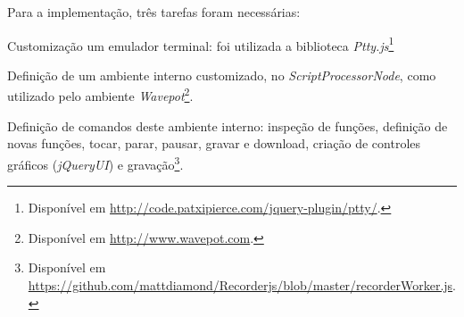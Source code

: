 Para a implementação, três tarefas foram necessárias: \begin{inparaenum}
\item Customização um emulador terminal: foi utilizada a biblioteca \emph{Ptty.js}\footnote{Disponível em \url{http://code.patxipierce.com/jquery-plugin/ptty/}.}
\item Definição de um ambiente interno customizado, no \emph{ScriptProcessorNode}, como utilizado pelo ambiente \emph{Wavepot}\footnote{Disponível em \url{http://www.wavepot.com}.}.
\item Definição de comandos deste ambiente interno: inspeção de funções, definição de novas funções, tocar, parar, pausar, gravar e download, criação de controles gráficos (\emph{jQueryUI}) e gravação\footnote{Disponível em \url{https://github.com/mattdiamond/Recorderjs/blob/master/recorderWorker.js}.}.
\end{inparaenum}


